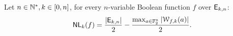 \documentclass[11pt]{llncs}
\begin{document}
\begin{Prop}\label{prop:nlk}
	Let $n\in \mathbb{N}^*, k\in [0,n]$, for every $n$-variable Boolean function $f$ over $\mathsf{E}_{k,n}$:
	\[ \mathsf{NL}_{k}(f)=\frac{|\mathsf{E}_{k,n}|}{2} -\frac{\max_{a\in \mathbb{F}_2^n} |\mathcal{W}_{f,k}(a)|}{2}  .\]
\end{Prop}








\end{document}
